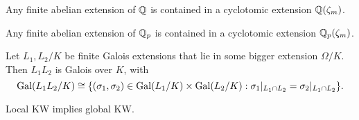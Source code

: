 \documentclass[11pt]{amsart}
\begin{document}
\begin{thm}[global KW]
    Any finite abelian extension of $\mathbb{Q}$ is contained in a cyclotomic extension $\mathbb{Q}(\zeta_m)$.
\end{thm}

\begin{thm}[local KW]
    Any finite abelian extension of $\mathbb{Q}_p$ is contained in a cyclotomic extension $\mathbb{Q}_p(\zeta_m)$.
\end{thm}

\begin{lem}
    Let $L_1,L_2/K$ be finite Galois extensions that lie in some bigger extension $\Omega/K$. Then $L_1L_2$ is Galois over $K$, with
    \[\operatorname{Gal}(L_1L_2/K) \cong \{(\sigma_1,\sigma_2)\in \operatorname{Gal}(L_1/K)\times \operatorname{Gal}(L_2/K): \sigma_1|_{L_1\cap L_2} = \sigma_2|_{L_1\cap L_2}\}.\]
\end{lem}


\begin{prop}
    Local KW implies global KW.
\end{prop}
\end{document}
